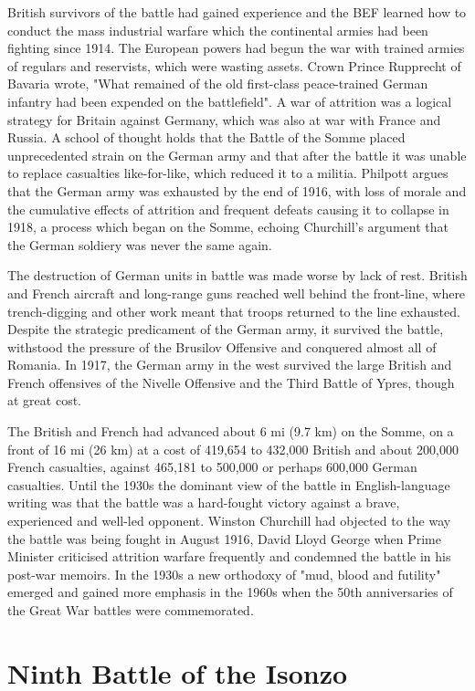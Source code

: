 \documentclass[a4paper,]{book}
\begin{document}
British survivors of the battle had gained experience and the BEF learned how to conduct the mass industrial warfare which the continental armies had been fighting since 1914. The European powers had begun the war with trained armies of regulars and reservists, which were wasting assets. Crown Prince Rupprecht of Bavaria wrote, "What remained of the old first-class peace-trained German infantry had been expended on the battlefield". A war of attrition was a logical strategy for Britain against Germany, which was also at war with France and Russia. A school of thought holds that the Battle of the Somme placed unprecedented strain on the German army and that after the battle it was unable to replace casualties like-for-like, which reduced it to a militia. Philpott argues that the German army was exhausted by the end of 1916, with loss of morale and the cumulative effects of attrition and frequent defeats causing it to collapse in 1918, a process which began on the Somme, echoing Churchill's argument that the German soldiery was never the same again.

The destruction of German units in battle was made worse by lack of rest. British and French aircraft and long-range guns reached well behind the front-line, where trench-digging and other work meant that troops returned to the line exhausted. Despite the strategic predicament of the German army, it survived the battle, withstood the pressure of the Brusilov Offensive and conquered almost all of Romania. In 1917, the German army in the west survived the large British and French offensives of the Nivelle Offensive and the Third Battle of Ypres, though at great cost.

The British and French had advanced about 6 mi (9.7 km) on the Somme, on a front of 16 mi (26 km) at a cost of 419,654 to 432,000 British and about 200,000 French casualties, against 465,181 to 500,000 or perhaps 600,000 German casualties. Until the 1930s the dominant view of the battle in English-language writing was that the battle was a hard-fought victory against a brave, experienced and well-led opponent. Winston Churchill had objected to the way the battle was being fought in August 1916, David Lloyd George when Prime Minister criticised attrition warfare frequently and condemned the battle in his post-war memoirs. In the 1930s a new orthodoxy of "mud, blood and futility" emerged and gained more emphasis in the 1960s when the 50th anniversaries of the Great War battles were commemorated.

\section{Ninth Battle of the Isonzo}
\end{document}
